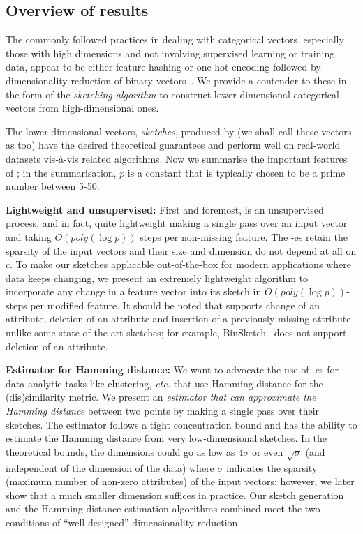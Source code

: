 \subsection{Overview of results} 
The commonly followed practices in dealing with categorical vectors, especially those with high dimensions and not involving supervised learning or training data, appear to be either feature hashing or one-hot encoding followed by dimensionality reduction of binary vectors~\cite[Chapter 5]{zheng2018feature}. We provide a contender to these in the form of the {\em \fsketch sketching algorithm} to construct lower-dimensional categorical vectors from high-dimensional ones.

The lower-dimensional vectors, {\it sketches}, produced by \fsketch (we shall call these vectors as \fsketch too) have the desired theoretical guarantees and perform well on real-world datasets vis-\`a-vis related algorithms. Now we summarise the important features of \fsketch; in the summarisation, $p$ is a constant that is typically chosen to be a prime number between 5-50.

{\bf Lightweight and unsupervised:} First and foremost, \fsketch is an unsupervised process, and in fact, quite lightweight making a single pass over an input vector and taking $O(poly(\log p))$ steps per non-missing feature. The \fsketch-es retain the sparsity of the input vectors and their size and dimension do not depend at all on $c$. To make our sketches applicable out-of-the-box for modern applications where data keeps changing, we present an extremely lightweight algorithm to incorporate any change in a feature vector into its sketch in $O(poly(\log p))$-steps per modified feature. It should be noted that \fsketch supports change of an attribute, deletion of an attribute and insertion of a previously missing attribute unlike some state-of-the-art sketches; for example,  BinSketch~\cite{ICDM} does not support deletion of an attribute.

{\bf Estimator for Hamming distance:} We want to advocate the use of \fsketch-es for data analytic tasks like clustering, {\it etc.} that use Hamming distance for the (dis)similarity metric. We present an {\em estimator that can approximate the Hamming distance} between two points by making a single pass over their sketches. The estimator follows a tight concentration bound and 
has the ability to estimate the Hamming distance from very low-dimensional sketches. In the theoretical bounds, the dimensions could go as low as $4\sigma$ or even $\sqrt{\sigma}$ (and independent of the dimension of the data) where $\sigma$ indicates the sparsity (maximum number of non-zero attributes) of the input vectors; however, we later show that a much smaller dimension suffices in practice. Our sketch generation and the Hamming distance estimation algorithms combined meet the two conditions of ``well-designed'' dimensionality reduction.


